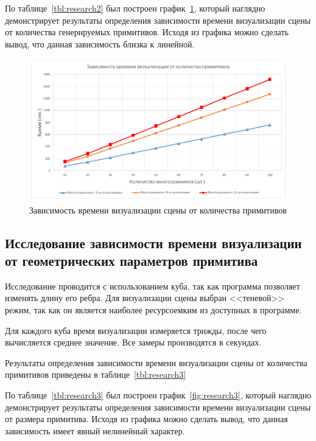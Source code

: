 По таблице~\ref{tbl:research2} был построен график~\ref{fig:research2}, который наглядно демонстрирует результаты определения зависимости времени визуализации сцены от количества генерируемых примитивов. Исходя из графика можно сделать вывод, что данная зависимость близка к линейной.

\clearpage

\begin{figure}[h] 
	\centering
	\includegraphics[width=1\textwidth]{images/research2.png}
	\caption{Зависимость времени визуализации сцены от количества примитивов} 
	\label{fig:research2} 
\end{figure}

\subsection{Исследование зависимости времени визуализации от геометрических параметров примитива}

Исследование проводится с использованием куба, так как программа позволяет изменять длину его ребра. Для визуализации сцены выбран <<теневой>> режим, так как он является наиболее ресурсоемким из доступных в программе.

Для каждого куба время визуализации измеряется трижды, после чего вычисляется среднее значение. Все замеры производятся в секундах.

Результаты определения зависимости времени визуализации сцены от количества примитивов приведены в таблице~\ref{tbl:research3}

По таблице~\ref{tbl:research3} был построен график~\ref{fig:research3}, который наглядно демонстрирует результаты определения зависимости времени визуализации сцены от размера примитива. Исходя из графика можно сделать вывод, что данная зависимость имеет явный нелинейный характер.

